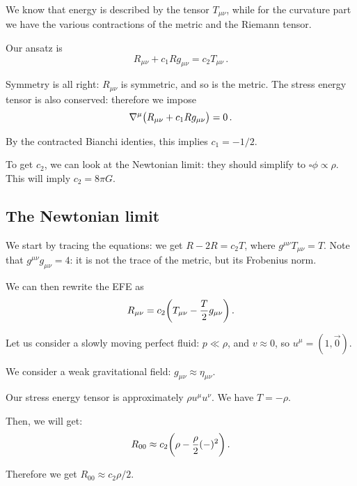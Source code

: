 \documentclass[main.tex]{subfiles}
\begin{document}
We know that energy is described by the tensor \(T_{\mu \nu }\), while for the curvature part we have the various contractions of the metric and the Riemann tensor.

Our ansatz is 
%
\begin{equation}
  R_{\mu \nu } + c_1 R g_{\mu \nu } = c_2 T_{\mu \nu }
\,.
\end{equation}

Symmetry is all right: \(R_{\mu \nu }\) is symmetric, and so is the metric.
The stress energy tensor is also conserved: therefore we impose 
%
\begin{equation}
  \nabla^{\mu } \qty(R_{\mu \nu } + c_1 R g_{\mu \nu })= 0
\,.
\end{equation}

By the contracted Bianchi identies, this implies \(c_1 = -1/2\).

To get \(c_2 \), we can look at the Newtonian limit: they should simplify to \(\square \phi \propto \rho \). This will imply \(c_2 = 8 \pi G \).

\subsection{The Newtonian limit}

We start by tracing the equations: we get \(R-2R = c_2 T \), where \(g^{\mu \nu }T_{\mu \nu }= T\).
Note that \(g^{ \mu \nu }g_{ \mu \nu }=4\): it is not the trace of the metric, but its Frobenius norm.

We can then rewrite the EFE as 
%
\begin{equation}
  R_{\mu \nu } = c_2 \qty(T_{\mu \nu } - \frac{T}{2}g_{\mu \nu })
\,.
\end{equation}
%

Let us consider a slowly moving perfect fluid: \(p \ll \rho \), and \(v \approx  0\), so \(u^{\mu } = (1, \vec{0})\).

We consider a weak gravitational field: \(g_{\mu \nu } \approx \eta_{\mu \nu } \).

Our stress energy tensor is approximately \(\rho u^{\mu } u^{\nu }\). We have \(T = - \rho \).

Then, we will get: 
%
\begin{equation}
  R_{00} \approx c_2 \qty(\rho - \frac{\rho}{2} (-)^2)
\,.
\end{equation}

Therefore we get \(R_{00} \approx c_2 \rho /2\).
\end{document}
